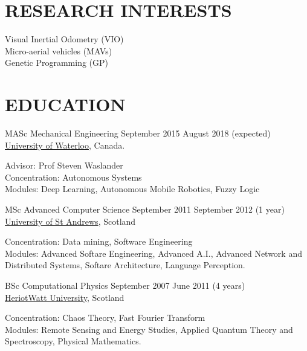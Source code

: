 \documentclass[line,margin]{cv}
\begin{document}

\address{Email: \href{mailto:chutsu@gmail.com}{chutsu@gmail.com}}
\address{ebsite: \href{http://chutsu.github.io}{http://chutsu.github.io}}


\begin{resume}

\section{RESEARCH INTERESTS}
Visual Inertial Odometry (VIO) \\
Micro-aerial vehicles (MAVs) \\
Genetic Programming (GP)



\section{EDUCATION}
MASc Mechanical Engineering
\hfill September 2015 \textemdash{} August 2018 (expected) \\
\href{http://www.uwaterloo.ca}{University of Waterloo}, Canada.

\vspace{0.1em}
\begin{adjustwidth}{2.0em}{2.0em}
	Advisor: Prof Steven Waslander \\
	Concentration: Autonomous Systems \\
	Modules: Deep Learning, Autonomous Mobile Robotics, Fuzzy Logic
\end{adjustwidth}


MSc Advanced Computer Science
\hfill September 2011 \textemdash{} September 2012 (1 year) \\
\href{http://www.st-andrews.ac.uk}{University of St Andrews}, Scotland

\vspace{0.1em}
\begin{adjustwidth}{2.0em}{2.0em}
	Concentration: Data mining, Software Engineering \\
	Modules: Advanced Softare Engineering, Advanced A.I., Advanced Network 
	and Distributed Systems, Softare Architecture, Language Perception.
\end{adjustwidth}


BSc Computational Physics
\hfill September 2007 \textemdash{} June 2011 (4 years) \\
\href{http://www.hw.ac.uk}{Heriot­Watt University}, Scotland

\vspace{0.1em}
\begin{adjustwidth}{2.0em}{2.0em}
	Concentration: Chaos Theory, Fast Fourier Transform \\
	Modules: Remote Sensing and Energy Studies, Applied Quantum Theory and Spectroscopy,
	Physical Mathematics.
\end{adjustwidth}




\end{resume}
\end{document}
